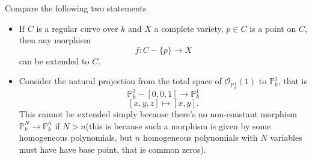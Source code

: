 \documentclass[../main.tex]{subfiles}
\begin{document}
\begin{example}
Compare the following two statements
\begin{itemize}
\item If $C$ is a regular curve over $k$ and $X$ a complete variety, $p\in C$ is a point on $C$, then any morphism  
$$f:C-\{p\}\rightarrow X$$
can be extended to $C$.
\item Consider the natural projection from the total space of $\mathcal{O}_{\mathbb{P}_{k}^{1}}(1)$ to $\mathbb{P}_{k}^{1}$, that is
$$\mathbb{P}^{2}_{k}-[0,0,1]\rightarrow \mathbb{P}_{k}^{1}$$
$$[x,y,z]\mapsto [x,y].$$
This cannot be extended simply because there's no non-constant morphism $\mathbb{P}_{k}^{N}\rightarrow \mathbb{P}_{k}^{n}$ if $N>n$(this is because such a morphism is given by some homogeneous polynomials, but $n$ homogeneous polynomials with $N$ variables must have have base point, that is common zeros). 
\end{itemize}

\end{example}
\end{document}
